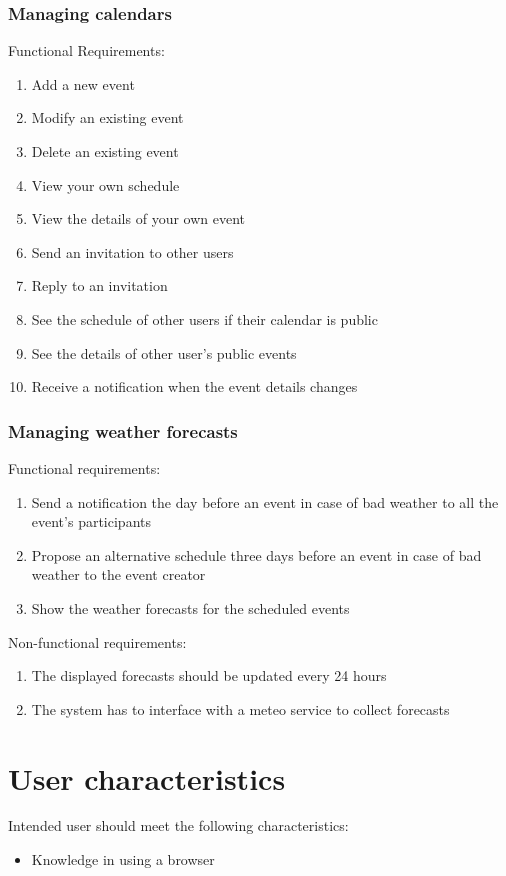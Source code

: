 \documentclass[10pt,a4paper,titlepage]{article}
\begin{document}
\subsubsection{Managing calendars}
Functional Requirements:
\begin{enumerate}[label = FR \arabic*:]
\item Add a new event
\item Modify an existing event
\item Delete an existing event
\item View your own schedule 
\item View the details of your own event
\item Send an invitation to other users
\item Reply to an invitation
\item See the schedule of other users if their calendar is public
\item See the details of other user's public events
\item Receive a notification when the event details changes
\end{enumerate}

\subsubsection{Managing weather forecasts}
Functional requirements:
\begin{enumerate}[label = FR \arabic*:]
\item Send a notification the day before an event in case of bad weather to all the event's participants
\item Propose an alternative schedule three days before an event in case of bad weather to the event creator
\item Show the weather forecasts for the scheduled events 
\end{enumerate}
Non-functional requirements:
\begin{enumerate}[label = NFR \arabic*:]
\item The displayed forecasts should be updated every 24 hours
\item The system has to interface with a meteo service to collect forecasts
\end{enumerate}

\section{User characteristics}
Intended user should meet the following characteristics:
\begin{itemize}
\item Knowledge in using a browser
\end{itemize}
\end{document}
